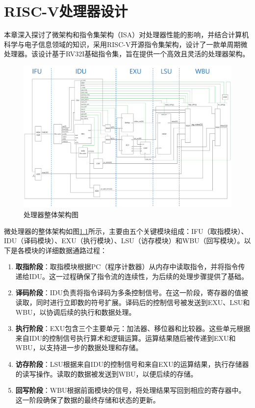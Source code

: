

\chapter{RISC-V处理器设计}
本章深入探讨了微架构和指令集架构（ISA）对处理器性能的影响，并结合计算机科学与电子信息领域的知识，采用RISC-V开源指令集架构，设计了一款单周期微处理器。该设计基于RV32I基础指令集，旨在提供一个高效且灵活的处理器架构。

\begin{figure}[htbp]
	\centering
	\includegraphics[width=1\textwidth]{image/cpu.pdf}
	\caption{处理器整体架构图}
	\label{fig:cpu}
\end{figure}

微处理器的整体架构如图\ref{fig:cpu}所示，主要由五个关键模块组成：IFU（取指模块）、IDU（译码模块）、EXU（执行模块）、LSU（访存模块）和WBU（回写模块）。以下是各模块的详细数据通路过程：

\begin{enumerate}
	\item \textbf{取指阶段}：取指模块根据PC（程序计数器）从内存中读取指令，并将指令传递给IDU。这一过程确保了指令流的连续性，为后续的处理步骤提供了基础。
	\item \textbf{译码阶段}：IDU负责将指令译码为多条控制信号。在这一阶段，寄存器的值被读取，同时进行立即数的符号扩展。译码后的控制信号被发送到EXU、LSU和WBU，以协调后续的执行和数据处理。
	\item \textbf{执行阶段}：EXU包含三个主要单元：加法器、移位器和比较器。这些单元根据来自IDU的控制信号执行算术和逻辑运算。运算结果随后被传递到EXU和WBU，以支持进一步的数据处理和存储。
	\item \textbf{访存阶段}：LSU根据来自IDU的控制信号和来自EXU的运算结果，执行存储器的读写操作。读取的数据被发送到WBU，以便后续的存储。
	\item \textbf{回写阶段}：WBU根据前面模块的信号，将处理结果写回到相应的寄存器中。这一阶段确保了数据的最终存储和状态的更新。
\end{enumerate}

